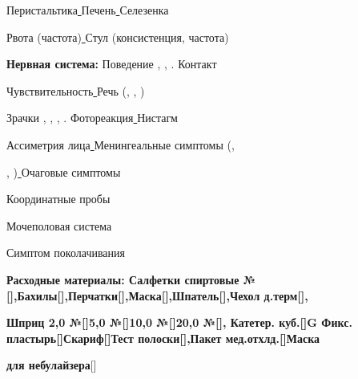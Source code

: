 \documentclass{medkarta}
\begin{document}
Перистальтика\uline{ \hfill}Печень\uline{ \hfill}Селезенка\uline{ \hfill}

Рвота (частота)\uline{ \hfill}Стул (консистенция, частота)\uline{ \hfill}

\textbf{Нервная система:} Поведение , , . Контакт\uline{ \hfill}

Чувствительность\uline{ \hfill}Речь (, , )\uline{ \hfill}

Зрачки , , , . Фотореакция\uline{ \hfill}Нистагм\uline{ \hfill}

Ассиметрия лица\uline{ \hfill}Менингеальные симптомы (,

, )\uline{ \hfill}Очаговые симптомы\uline{ \hfill}

Координатные пробы\uline{ \hfill}

Мочеполовая система\uline{ \hfill}

Симптом поколачивания\uline{ \hfill}

\begin{status}
\end{status}
\begin{data}
\end{data}
\begin{help}
\end{help}

\textbf{Расходные материалы: Салфетки спиртовые №[],Бахилы[],Перчатки[],Маска[],Шпатель[],Чехол д.терм[],}

\textbf{Шприц 2,0 №[]5,0 №[]10,0 №[]20,0 №[], Катетер. куб.[]G Фикс. пластырь[]Скариф[]Тест полоски[],Пакет мед.отхлд.[]Маска}

\textbf{для небулайзера}[]

\uline{ \hfill}
\end{document}
